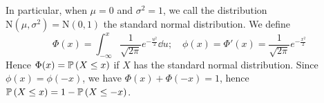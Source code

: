 In particular, when \(\mu = 0\) and \(\sigma^2 = 1\), we call the distribution \(\mathrm{N}(\mu, \sigma^2) = \mathrm{N}(0, 1)\) the standard normal distribution.
We define
\[
	\Phi(x) = \int_{-\infty}^x \frac{1}{\sqrt{2\pi}} e^{-\frac{u^2}{2}} \dd{u};\quad \phi(x) = \Phi'(x) = \frac{1}{\sqrt{2\pi}} e^{-\frac{x^2}{2}}
\]
Hence \(\Phi(x) = \mathbb{P}\left({X \leq x}\right)\) if \(X\) has the standard normal distribution.
Since \(\phi(x) = \phi(-x)\), we have \(\Phi(x) + \Phi(-x) = 1\), hence \(\mathbb{P}\left({X \leq x}\right) = 1 - \mathbb{P}\left({X \leq -x}\right)\).
